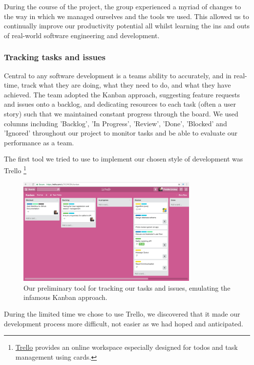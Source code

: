 During the course of the project, the group experienced a myriad of changes to the way in which we managed ourselves and the tools we used. This allowed us to continually improve our productivity potential all whilst learning the ins and outs of real-world software engineering and development.

\subsubsection{Tracking tasks and issues}

Central to any software development is a teams ability to accurately, and in real-time, track what they are doing, what they need to do, and what they have achieved. The team adopted the Kanban approach, suggesting feature requests and issues onto a backlog, and dedicating resources to each task (often a user story) such that we maintained constant progress through the board. We used columns including 'Backlog', 'In Progress', 'Review', 'Done',  'Blocked' and 'Ignored' throughout our project to monitor tasks and be able to evaluate our performance as a team.

The first tool we tried to use to implement our chosen style of development was Trello \footnote{\href{https://trello.com}{Trello} provides an online workspace especially designed for todos and task management using cards.}

\begin{figure}[H]
	\centering
	\includegraphics[width=0.8\textwidth]{images/trello-kanban}	
	\caption[CowHub's 'Kanban' board on Trello]{
		Our preliminary tool for tracking our tasks and issues, emulating the infamous Kanban approach.
	}
\end{figure}

During the limited time we chose to use Trello, we discovered that it made our development process more difficult, not easier as we had hoped and anticipated. 

